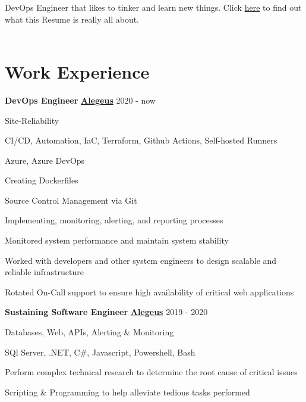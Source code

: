 \documentclass[a4paper]{mctemplate} %
\begin{document}

\begin{main}


{DevOps Engineer that likes to tinker and learn new things. Click \href{https://github.com/brandoneto/resume} {here} to find out what this Resume is really all about.} \\ \\
\section{Work Experience}


    {{\textbf{DevOps Engineer}} \hfill \footnotesize{\href{https://www.alegeus.com/}{\textbf{Alegeus}} 2020 - now}}

\begin{itemize}[noitemsep]
    {
        \item Site-Reliability
        \item CI/CD, Automation, IaC, Terraform, Github Actions, Self-hosted Runners
        \item Azure, Azure DevOps
        \item Creating Dockerfiles
        \item Source Control Management via Git
        \item Implementing, monitoring, alerting, and reporting processes
        \item Monitored system performance and maintain system stability
        \item Worked with developers and other system engineers to design scalable and reliable infrastructure
        \item Rotated On-Call support to ensure high availability of critical web applications
    }
\end{itemize}

    {{\textbf{Sustaining Software Engineer}} \hfill \footnotesize{\href{https://www.alegeus.com/}{\textbf{Alegeus}} 2019 - 2020}}

\begin{itemize}[noitemsep]
    {
        \item Databases, Web, APIs, Alerting \& Monitoring 
        \item SQl Server, .NET, C\#, Javascript, Powershell, Bash 
        \item Perform complex technical research to determine the root cause of critical issues
        \item Scripting \& Programming to help alleviate tedious tasks performed
    }
\end{itemize}


\end{main}
\end{document}
